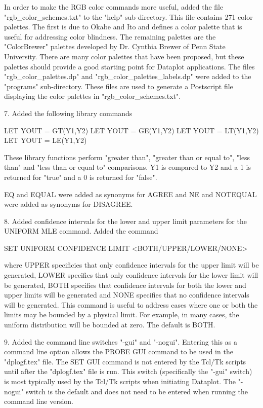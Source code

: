     In order to make the RGB color commands more useful, added the file
    "rgb_color_schemes.txt" to the "help" sub-directory.  This file
    contains 271 color palettes.  The first is due to Okabe and Ito and
    defines a color palette that is useful for addressing color blindness.
    The remaining palettes are the "ColorBrewer" palettes developed by
    Dr. Cynthia Brewer of Penn State University.  There are many color
    palettes that have been proposed, but these palettes should provide
    a good starting point for Dataplot applications.  The files
    "rgb_color_palettes.dp" and "rgb_color_palettes_labels.dp" were added
    to the "programs" sub-directory.  These files are used to generate
    a Postscript file displaying the color palettes in
    "rgb_color_schemes.txt".

 7. Added the following library commands

       LET YOUT = GT(Y1,Y2)
       LET YOUT = GE(Y1,Y2)
       LET YOUT = LT(Y1,Y2)
       LET YOUT = LE(Y1,Y2)

    These library functions perform "greater than", "greater than
    or equal to", "less than" and "less than or equal to" comparisons.
    Y1 is compared to Y2 and a 1 is returned for "true" and a 0 is
    returned for "false".

    EQ and EQUAL were added as synonyms for AGREE and NE and NOTEQUAL
    were added as synonyms for DISAGREE.

 8. Added confidence intervals for the lower and upper limit
    parameters for the UNIFORM MLE command.  Added the command

        SET UNIFORM CONFIDENCE LIMIT <BOTH/UPPER/LOWER/NONE>

    where UPPER specificies that only confidence intervals for the
    upper limit will be generated, LOWER specifies that only confidence
    intervals for the lower limit will be generated, BOTH specifies
    that confidence intervals for both the lower and upper limits will
    be generated and NONE specifies that no confidence intervals will
    be generated.  This command is useful to address cases where one
    or both the limits may be bounded by a physical limit.  For example,
    in many cases, the uniform distribution will be bounded at zero.
    The default is BOTH.

 9. Added the command line switches "-gui" and "-nogui".  Entering
    this as a command line option allows the PROBE GUI command to
    be used in the "dplogf.tex" file.  The SET GUI command is not
    entered by the Tcl/Tk scripts until after the "dplogf.tex" file
    is run.  This switch (specifically the "-gui" switch) is most
    typically used by the Tcl/Tk scripts when initiating Dataplot.
    The "-nogui" switch is the default and does not need to be
    entered when running the command line version.

